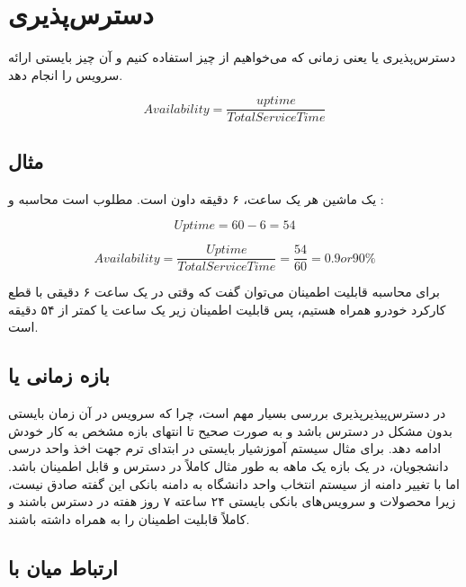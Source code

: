 \section{دسترس‌پذیری}

دسترس‌پذیری یا   یعنی زمانی که می‌خواهیم از چیز استفاده کنیم و
آن چیز بایستی ارائه سرویس را انجام دهد.

\begin{equation}
    Availability = \frac{uptime}{Total Service Time}
\end{equation}

\subsection*{مثال}

یک ماشین هر یک ساعت، ۶ دقیقه داون است. مطلوب است محاسبه  و
:

\begin{equation}
    Uptime = 60-6 = 54
\end{equation}

\begin{equation}
    Availability = \frac{Uptime}{Total Service Time} = \frac{54}{60} = 0.9 or 90\%
\end{equation}

برای محاسبه قابلیت اطمینان می‌توان گفت که وقتی در یک ساعت ۶ دقیقی با قطع کارکرد
خودرو همراه هستیم، پس قابلیت اطمینان زیر یک ساعت یا کمتر از ۵۴ دقیقه است.

\subsection{بازه زمانی یا }

در دسترس‌پیذیرپذیری بررسی  بسیار مهم است، چرا که سرویس در آن زمان
بایستی بدون مشکل در دسترس باشد و به صورت صحیح تا انتهای بازه مشخص  به کار خودش ادامه دهد. برای مثال سیستم آموزشیار بایستی در ابتدای ترم جهت
اخذ واحد درسی دانشجویان، در یک بازه یک ماهه به طور مثال کاملاً در دسترس و قابل
اطمینان باشد. اما با تغییر دامنه از سیستم انتخاب واحد دانشگاه به دامنه بانکی این
گفته صادق نیست، زیرا محصولات و سرویس‌‌های بانکی بایستی ۲۴ ساعته ۷ روز هفته در
دسترس باشند و کاملاً قابلیت اطمینان را به همراه داشته باشند.

\subsection{ارتباط میان  با }

